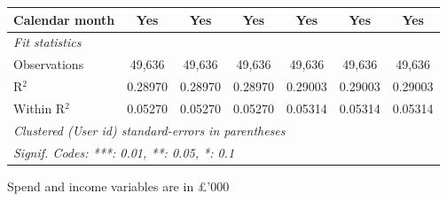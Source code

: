 \begin{table}[htbp]
\begin{threeparttable}[b]
\begin{tabular}{lcccccc}
         Calendar month          & Yes            & Yes            & Yes            & Yes            & Yes            & Yes\\  
         \midrule
         \emph{Fit statistics}\\
         Observations            & 49,636         & 49,636         & 49,636         & 49,636         & 49,636         & 49,636\\  
         R$^2$                   & 0.28970        & 0.28970        & 0.28970        & 0.29003        & 0.29003        & 0.29003\\  
         Within R$^2$            & 0.05270        & 0.05270        & 0.05270        & 0.05314        & 0.05314        & 0.05314\\  
         \midrule \midrule
         \multicolumn{7}{l}{\emph{Clustered (User id) standard-errors in parentheses}}\\
         \multicolumn{7}{l}{\emph{Signif. Codes: ***: 0.01, **: 0.05, *: 0.1}}\\
      \end{tabular}
      
      \begin{tablenotes}\footnotesize
         \item Spend and income variables are in £'000
      \end{tablenotes}
   \end{threeparttable}
\end{table}


